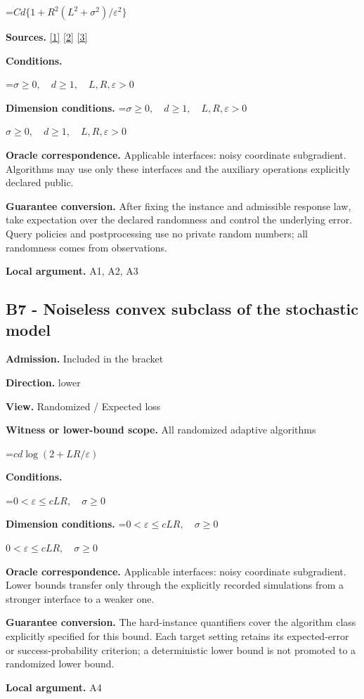 \documentclass[10pt,a4paper]{article}
\newcommand{\AtlasMath}[1]{\par\begingroup\centering\setbox0=\hbox{$\displaystyle #1$}\ifdim\wd0>1.4\linewidth\typeout{ATLAS WIDE FORMULA: \the\wd0}\fi\ifdim\wd0>\linewidth\resizebox{\linewidth}{!}{\box0}\else\box0\fi\par\endgroup}
\newcommand{\AtlasInlineMath}[1]{\begingroup\setbox0=\hbox{$#1$}\ifdim\wd0>.4\linewidth\endgroup\AtlasMath{#1}\else\endgroup$#1$\fi}
\begin{document}
\AtlasMath{Cd\{1+R^2(L^2+\sigma^2)/\varepsilon^2\}}
\textbf{Sources.} \href{https://arxiv.org/pdf/1405.4980}{[1]} \href{https://www2.isye.gatech.edu/~nemirovs/MOR_AccuracyCertificates.pdf}{[2]} \href{https://arxiv.org/pdf/2609.20701}{[3]}

\textbf{Conditions.} 
\AtlasMath{\sigma\ge0,\quad d\ge1,\quad L,R,\varepsilon>0}


\textbf{Dimension conditions.} \AtlasInlineMath{\sigma\ge0,\quad d\ge1,\quad L,R,\varepsilon>0}

\textbf{Oracle correspondence.} Applicable interfaces: noisy coordinate subgradient. Algorithms may use only these interfaces and the auxiliary operations explicitly declared public.

\textbf{Guarantee conversion.} After fixing the instance and admissible response law, take expectation over the declared randomness and control the underlying error. Query policies and postprocessing use no private random numbers; all randomness comes from observations.

\textbf{Local argument.} A1, A2, A3

\subsection{B7 - Noiseless convex subclass of the stochastic model}
\textbf{Admission.} Included in the bracket

\textbf{Direction.} lower

\textbf{View.} Randomized / Expected loss

\textbf{Witness or lower-bound scope.} All randomized adaptive algorithms

\AtlasMath{cd\log(2+LR/\varepsilon)}
\textbf{Conditions.} 
\AtlasMath{0<\varepsilon\le cLR,\quad\sigma\ge0}


\textbf{Dimension conditions.} \AtlasInlineMath{0<\varepsilon\le cLR,\quad\sigma\ge0}

\textbf{Oracle correspondence.} Applicable interfaces: noisy coordinate subgradient. Lower bounds transfer only through the explicitly recorded simulations from a stronger interface to a weaker one.

\textbf{Guarantee conversion.} The hard-instance quantifiers cover the algorithm class explicitly specified for this bound. Each target setting retains its expected-error or success-probability criterion; a deterministic lower bound is not promoted to a randomized lower bound.

\textbf{Local argument.} A4
\end{document}
